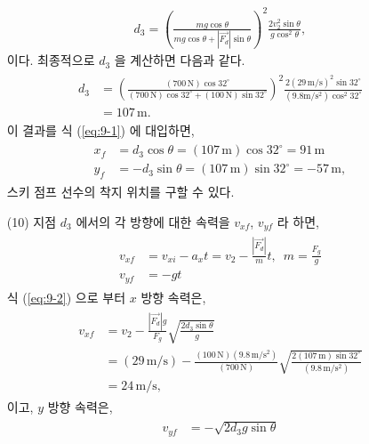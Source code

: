 \documentclass[floatfix,nofootinbib,superscriptaddress,fleqn]{revtex4-2}
\begin{document}
\begin{itemize}
\begin{align}
    d_3=\left(\frac{mg\cos{\theta}}{mg\cos{\theta}
    +|\vec{F_d}|\sin{\theta}}\right)^2
   \frac{2v_2^2\sin{\theta}}{g\cos^2{\theta}},
  \end{align}
  이다. 최종적으로 $d_3$ 을 계산하면 다음과 같다.
  \begin{align}
    \begin{split}
      d_3 &=\left(\frac{(700\,\mathrm{N})\cos{32^\circ}}{(700\,\mathrm{N})\cos{32^\circ}
      +(100\,\mathrm{N})\sin{32^\circ}}\right)^2
      \frac{2(29\,\mathrm{m/s})^2\sin{32^\circ}}{(9.8\mathrm{m/s^2})\cos^2{32^\circ}} \\
      &= 107\,\mathrm{m}.
    \end{split}
  \end{align} 
  이 결과를 식 (\ref{eq:9-1}) 에 대입하면,
  \begin{align}
    \begin{split}
      x_f &= d_3\cos{\theta}= (107\,\mathrm{m})\cos{32^\circ} =  91\,\mathrm{m} \\
      y_f &=-d_3\sin{\theta}= (107\,\mathrm{m})\sin{32^\circ} = -57\,\mathrm{m},
    \end{split}
  \end{align}
  스키 점프 선수의 착지 위치를 구할 수 있다.
  \item[(10)] 지점 $d_3$ 에서의 각 방향에 대한 속력을 $v_{xf}$, $v_{yf}$ 라 하면,
  \begin{align}
    \begin{split}
      v_{x f} &= v_{xi}-a_x t = v_2 - \frac{|\vec{F_d}|}{m}t,\,\,\,m=\frac{F_g}{g} \\
      v_{y f} &= -gt
    \end{split}
  \end{align} 
  식 (\ref{eq:9-2}) 으로 부터 $x$ 방향 속력은,
  \begin{align}
    \begin{split}
      v_{x f} &=  v_2 - \frac{|\vec{F_d}|g}{F_g}\sqrt{\frac{2d_3\sin{\theta}}{g}} \\
      &= (29\,\mathrm{m/s}) - \frac{(100\,\mathrm{N})(9.8\,\mathrm{m/s^2})}
      {(700\,\mathrm{N})}\sqrt{\frac{2(107\,\mathrm{m})\sin{32^\circ}}
      {(9.8\,\mathrm{m/s^2})}}  \\
      &= 24\,\mathrm{m/s},
    \end{split}
  \end{align}
  이고, $y$ 방향 속력은,
  \begin{align}
    \begin{split}
      v_{y f} &= -\sqrt{2d_3g\sin{\theta}}  \\

\end{split}
\end{align}
\end{itemize}
\end{document}

